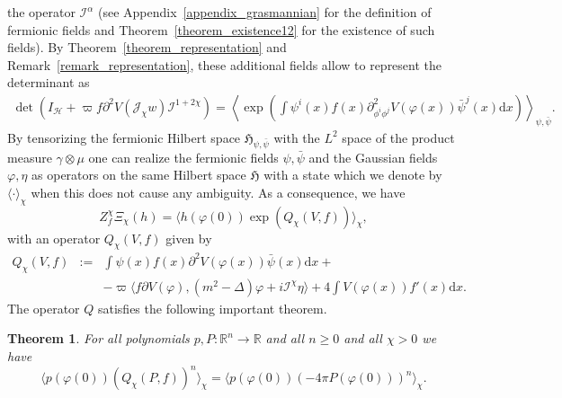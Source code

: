 \documentclass[a4paper,10pt]{article}
\newcommand{\assign}{:=}
\newcommand{\mathd}{\mathrm{d}}
\newtheorem{theorem}{Theorem}
\begin{document}
the operator $\mathcal{I}^{\alpha}$ (see Appendix~\ref{appendix_grasmannian}
for the definition of fermionic fields and Theorem~\ref{theorem_existence12}
for the existence of such fields). By Theorem~\ref{theorem_representation} and
Remark~\ref{remark_representation}, these additional fields allow to represent
the determinant as
\begin{multline*}
  \det (I_{\mathcal{H}} + \varpi f \partial^2 V (\mathcal{J}_{\chi} w)
  \mathcal{I}^{1 + 2 \chi}) = \left\langle \exp \left( \int \psi^i (x) f (x) \partial^2_{\phi^i \phi^j}
  V (\varphi (x)) \bar{\psi}^j (x) \mathd x \right) \right\rangle_{\psi,
  \bar{\psi}} .
\end{multline*}
By tensorizing the fermionic Hilbert space $\mathfrak{H}_{\psi, \bar{\psi}}$
with the $L^2$ space of the product measure $\gamma \otimes \mu$ one can
realize the fermionic fields $\psi, \bar{\psi}$ and the Gaussian fields
$\varphi, \eta$ as operators on the same Hilbert space $\mathfrak{H}$ with a
state which we denote by $\langle \cdot \rangle_{\chi}$ when this does not
cause any ambiguity. As a consequence, we have
\begin{equation}
  Z_f^{\chi} \Xi_{\chi} (h) = \langle h (\varphi (0)) \exp (Q_{\chi} (V, f))
  \rangle_{\chi}, \label{eq:exp-V-general}
\end{equation}
with an operator $Q_{\chi} (V, f)$ given by
\begin{eqnarray*}
  Q_{\chi} (V, f) & \assign & \int \psi (x) f (x) \partial^2 V (\varphi (x))
  \bar{\psi} (x) \mathd x +\\
  &  & - \varpi \langle f \partial V (\varphi), (m^2 - \Delta) \varphi +
  i\mathcal{I}^{\chi} \eta \rangle + 4 \int V (\varphi (x)) f' (x) \mathd x.
\end{eqnarray*}
The operator $Q$ satisfies the following important theorem.

\begin{theorem}
  \label{th:pol-eq}For all polynomials $p, P : \mathbb{R}^n \rightarrow
  \mathbb{R}$ and all $n \geqslant 0$ and all $\chi > 0$ we have
  \begin{equation}
    \langle p (\varphi (0)) (Q_{\chi} (P, f))^n \rangle_{\chi} = \langle p
    (\varphi (0)) (- 4 \pi P (\varphi (0)))^n \rangle_{\chi} .
    \label{eq:pol-eq}
  \end{equation}
\end{theorem}
\end{document}
